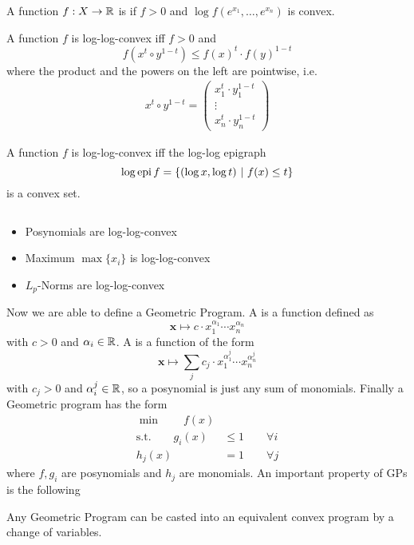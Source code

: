 \documentclass[answers]{exam}
\begin{document}
    \begin{definition}
        A function $f:X\to \mathbb{R}$ is  if $f > 0$ and $\log f(e^{x_1}, \ldots, e^{x_n})$ is convex.
    \end{definition}
    \begin{proposition}
        A function $f$ is log-log-convex iff $f> 0$ and 
        $$ f\left(x^t\circ y^{1-t}\right) \leq f(x)^t \cdot f(y)^{1-t} $$
        where the product and the powers on the left are pointwise, i.e.
        \begin{align*}
            x^t\circ y^{1-t} = \begin{pmatrix}
                x_1^t \cdot y_1^{1-t} \\ 
                \vdots \\ 
                x_n^t \cdot y_n^{1-t}
            \end{pmatrix}
        \end{align*}
    \end{proposition}
    \begin{proposition}
        A function $f$ is log-log-convex iff the log-log epigraph 
        $$ \log \operatorname*{epi} f = \left\{(\log x,\log t) \ \middle|\ f(x) \leq t\right\} $$
        is a convex set.
    \end{proposition}

    \begin{remark} $\ $
        \begin{itemize}
            \item Posynomials are log-log-convex 
            \item Maximum $\max\{x_i\}$ is log-log-convex 
            \item $L_p$-Norms are log-log-convex
        \end{itemize}
    \end{remark}

    Now we are able to define a Geometric Program. A  is a function defined as  
    $$ \textbf{x} \mapsto c\cdot x_1^{\alpha_1}\cdots x_n^{\alpha_n} $$
    with $c > 0$ and $\alpha_i \in \mathbb{R}$. A  is a function of the form 
    $$ \textbf{x} \mapsto \sum_j c_j\cdot x_1^{\alpha_1^j}\cdots x_n^{\alpha_n^j} $$
    with $c_j > 0$ and $\alpha_i^j \in \mathbb{R}$, so a posynomial is just any sum of monomials. Finally a Geometric program has the form
    \begin{align*}
        \min \qquad f(x)& \\ 
        \text{s.t.} \qquad g_i(x)& \leq 1\qquad \forall i \\ 
        h_j(x) &= 1\qquad \forall j 
    \end{align*}
    where $f, g_i$ are posynomials and $h_j$ are monomials. An important property of GPs is the following 
    \begin{proposition}
        Any Geometric Program can be casted into an equivalent convex program by a change of variables.
    \end{proposition}
\end{document}
